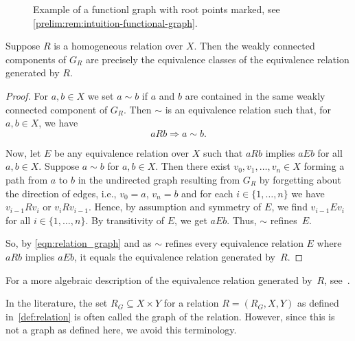 \begin{remark}
\begin{figure}[ht]
		\caption[Example functional graph]{Example of a functionl graph with root points marked, see \cref{prelim:rem:intuition-functional-graph}.}
		\label{prelim:trans:fig:nonpermpoint}	
	\end{figure}	
\end{remark}

\begin{proposition}
	\label{prelim:fact:relation_graph} Suppose $R$ is a homogeneous relation over $X$.
	Then the weakly connected components of $G_R$ 
	are precisely the equivalence classes of the equivalence relation generated by $R$.
\end{proposition}
\begin{proof}
	For $a, b \in X$
	we set $a \sim b$ 
	if $a$ and $b$ are contained in the same weakly connected component of $G_R$.
	Then $\sim$ is an equivalence relation such that, for $a,b \in X$, we have
	\begin{equation}\label{eqn:relation_graph}
	aRb \Rightarrow a \sim b.
	\end{equation}
		
	Now, let $E$ be any equivalence relation over $X$
	such that $a R b$ implies $a E b$ for all $a,b \in X$.
	Suppose $a \sim b$ for $a,b \in X$.
	Then there exist $v_0, v_1,\ldots, v_n \in X$ forming a path from $a$ to $b$ in the undirected graph
	resulting from $G_R$ by forgetting about the direction of edges, i.e., $v_0 = a$, $v_n = b$ and
	for each $i \in \{1,\ldots,n\}$ we have
	$
    v_{i-1} R v_i \text{ or } v_i R v_{i-1}.
    $
	Hence, by assumption and symmetry of $E$,
	we find $v_{i-1} E v_i$ for all $i \in \{1,\ldots,n\}$.
    By transitivity of $E$, we get $aEb$.
    Thus, $\sim$ refines~$E$.
    
    So, by \cref{eqn:relation_graph}
    and as $\sim$ refines every equivalence
    relation $E$ where $aRb$ implies $aEb$,
    it equals the equivalence relation generated by~$R$.
\end{proof}

For a more algebraic description of the equivalence relation
generated by~$R$, see~\cite[Prop.~1.4.9 \& 1.4.10]{howie1995fundamentals}.

\begin{remark}
	In the literature,
	the set $R_G \subseteq X \times Y$
	for a relation $R = (R_G, X, Y)$
	as defined in~\cref{def:relation}
	is often called the graph of the relation. However,
	since this is not a graph as defined
	here, we avoid this terminology.
\end{remark}